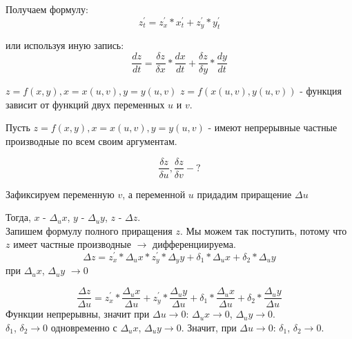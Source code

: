     Получаем формулу:
    \begin{equation}
        z_{t}^{'} = z_{x}^{'} * x_{t}^{'} + z_{y}^{'} * y_{t}^{'}
    \end{equation}
    
    или используя иную запись:
    \begin{equation}
        \frac{dz}{dt} = \frac{\delta{z}}{\delta{x}} * \frac{dx}{dt} + \frac{\delta{z}}{\delta{y}} * \frac{dy}{dt} 
    \end{equation}
    
\begin{theorem}[\rom{2}]
    $z=f(x,y), x=x(u,v), y=y(u,v)$
    \newline $z=f(x(u,v),y(u,v))$ - функция зависит от функций двух переменных $u$ и $v$.
\end{theorem}

    Пусть $z=f(x,y), x=x(u,v), y=y(u,v)$ - имеют непрерывные частные производные по всем своим аргументам.
    
    \begin{equation*}
        \frac{\delta{z}}{\delta{u}}, \frac{\delta{z}}{\delta{v}} - ? 
    \end{equation*}
    
    Зафиксируем переменную $v$, а переменной $u$ придадим приращение $\Delta{u}$
    
    Тогда, $x$ - $\Delta{}_{u}x$, $y$ - $\Delta{}_{u}y$, $z$ - $\Delta{z}$.\\
    
    Запишем формулу полного приращения $z$. Мы можем так поступить, потому что $z$ имеет частные производные $\longrightarrow$ дифференциируема.
    \begin{equation}
        \Delta{z} = z_{x}^{'} * \Delta_{u}x * z_{y}^{'} * \Delta_{y}y + \delta_{1} * \Delta_{u}x + \delta_{2} * \Delta_{u}y
    \end{equation}
    при $\Delta_{u}x$, $\Delta_{u}y$ $\longrightarrow 0$

    \begin{equation*}
        \frac{\Delta{z}}{\Delta{u}} = z_{x}^{'} * \frac{\Delta_{u}x}{\Delta{u}} + z_{y}^{'} * \frac{\Delta_{u}y}{\Delta{u}} + \delta_{1} * \frac{\Delta_{u}x}{\Delta{u}} + \delta_{2} * \frac{\Delta_{u}y}{\Delta{u}}
    \end{equation*}
    Функции непрерывны, значит при $\Delta{u} \longrightarrow 0$: $\Delta_{u}x \longrightarrow 0$, $\Delta_{u}y \longrightarrow 0$.\\
    $\delta_{1}$, $\delta_{2} \longrightarrow 0$ одновременно с $\Delta_{u}x$, $\Delta_{u}y \longrightarrow 0$. Значит, при $\Delta{u} \longrightarrow 0$: $\delta_{1}$, $\delta_{2} \longrightarrow 0$.
    
